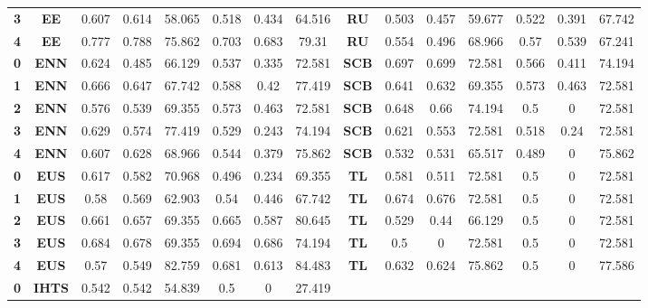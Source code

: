 {{\begin{tabular}{c|c|cccccc|ccccccc}
\textbf{3} & \textbf{EE} & 0.607 & 0.614 & 58.065 & 0.518 & 0.434 & 64.516 & \multicolumn{1}{c|}{\textbf{RU}} & 0.503 & 0.457 & 59.677 & 0.522 & 0.391 & 67.742 \\
\textbf{4} & \textbf{EE} & 0.777 & 0.788 & 75.862 & 0.703 & 0.683 & 79.31 & \multicolumn{1}{c|}{\textbf{RU}} & 0.554 & 0.496 & 68.966 & 0.57  & 0.539 & 67.241 \\
\textbf{0} & \textbf{ENN} & 0.624 & 0.485 & 66.129 & 0.537 & 0.335 & 72.581 & \multicolumn{1}{c|}{\textbf{SCB}} & 0.697 & 0.699 & 72.581 & 0.566 & 0.411 & 74.194 \\
\textbf{1} & \textbf{ENN} & 0.666 & 0.647 & 67.742 & 0.588 & 0.42  & 77.419 & \multicolumn{1}{c|}{\textbf{SCB}} & 0.641 & 0.632 & 69.355 & 0.573 & 0.463 & 72.581 \\
\textbf{2} & \textbf{ENN} & 0.576 & 0.539 & 69.355 & 0.573 & 0.463 & 72.581 & \multicolumn{1}{c|}{\textbf{SCB}} & 0.648 & 0.66  & 74.194 & 0.5   & 0     & 72.581 \\
\textbf{3} & \textbf{ENN} & 0.629 & 0.574 & 77.419 & 0.529 & 0.243 & 74.194 & \multicolumn{1}{c|}{\textbf{SCB}} & 0.621 & 0.553 & 72.581 & 0.518 & 0.24  & 72.581 \\
\textbf{4} & \textbf{ENN} & 0.607 & 0.628 & 68.966 & 0.544 & 0.379 & 75.862 & \multicolumn{1}{c|}{\textbf{SCB}} & 0.532 & 0.531 & 65.517 & 0.489 & 0     & 75.862 \\
\textbf{0} & \textbf{EUS} & 0.617 & 0.582 & 70.968 & 0.496 & 0.234 & 69.355 & \multicolumn{1}{c|}{\textbf{TL}} & 0.581 & 0.511 & 72.581 & 0.5   & 0     & 72.581 \\
\textbf{1} & \textbf{EUS} & 0.58  & 0.569 & 62.903 & 0.54  & 0.446 & 67.742 & \multicolumn{1}{c|}{\textbf{TL}} & 0.674 & 0.676 & 72.581 & 0.5   & 0     & 72.581 \\
\textbf{2} & \textbf{EUS} & 0.661 & 0.657 & 69.355 & 0.665 & 0.587 & 80.645 & \multicolumn{1}{c|}{\textbf{TL}} & 0.529 & 0.44  & 66.129 & 0.5   & 0     & 72.581 \\
\textbf{3} & \textbf{EUS} & 0.684 & 0.678 & 69.355 & 0.694 & 0.686 & 74.194 & \multicolumn{1}{c|}{\textbf{TL}} & 0.5   & 0     & 72.581 & 0.5   & 0     & 72.581 \\
\textbf{4} & \textbf{EUS} & 0.57  & 0.549 & 82.759 & 0.681 & 0.613 & 84.483 & \multicolumn{1}{c|}{\textbf{TL}} & 0.632 & 0.624 & 75.862 & 0.5   & 0     & 77.586 \\
\textbf{0} & \textbf{IHTS} & 0.542 & 0.542 & 54.839 & 0.5   & 0     & 27.419 &       &       &       &       &       &       &  \\

\end{tabular}}}
